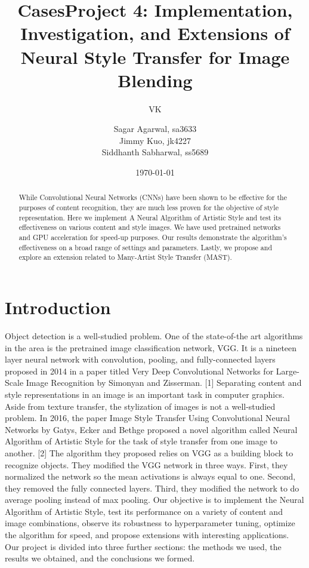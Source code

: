 \documentclass{article}
\title{Cases}
\author{VK}
\date{\today}
\title{Project 4: Implementation, Investigation, and Extensions of Neural Style Transfer for Image Blending}
\author{Sagar Agarwal, sa3633\\Jimmy Kuo, jk4227\\ Siddhanth Sabharwal, ss5689}
\begin{document}
\maketitle

\begin{abstract}

\noindent While Convolutional Neural Networks (CNNs) have been shown to be effective for the purposes of content recognition, they are much less proven for the objective of style representation. Here we implement A Neural Algorithm of Artistic Style and test its effectiveness on various content and style images. We have used pretrained networks and GPU acceleration for speed-up purposes. Our results demonstrate the algorithm's effectiveness on a broad range of settings and parameters. Lastly, we propose and explore an extension related to Many-Artist Style Transfer (MAST).

\end{abstract}

\section{Introduction}

Object detection is a well-studied problem. One of the state-of-the art algorithms in the area is the pretrained image classification network, VGG. It is a nineteen layer neural network with convolution, pooling, and fully-connected layers proposed in 2014 in a paper titled Very Deep Convolutional Networks for Large-Scale Image Recognition by Simonyan and Zisserman. [1] Separating content and style representations in an image is an important task in computer graphics. Aside from texture transfer, the stylization of images is not a well-studied problem. In 2016, the paper Image Style Transfer Using Convolutional Neural Networks by Gatys, Ecker and Bethge proposed a novel algorithm called Neural Algorithm of Artistic Style for the task of style transfer from one image to another. [2] The algorithm they proposed relies on VGG as a building block to recognize objects. They modified the VGG network in three ways. First, they normalized the network so the mean activations is always equal to one. Second, they removed the fully connected layers. Third, they modified the network to do average pooling instead of max pooling. Our objective is to implement the Neural Algorithm of Artistic Style, test its performance on a variety of content and image combinations, observe its robustness to hyperparameter tuning, optimize the algorithm for speed, and propose extensions with interesting applications. Our project is divided into three further sections: the methods we used, the results we obtained, and the conclusions we formed.
\end{document}
